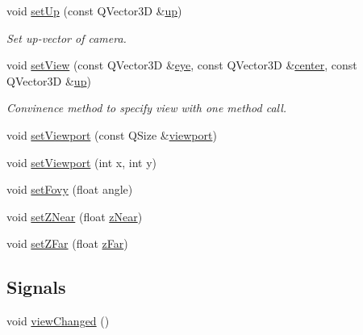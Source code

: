 \begin{DoxyCompactItemize}
void \hyperlink{class_camera_a037ef3f032c7fc09fa1f044260dd3a09}{set\+Up} (const Q\+Vector3\+D \&\hyperlink{class_camera_a86995a93a125a9d9941f10144c4c398e}{up})
\begin{DoxyCompactList}\small\item\em Set up-\/vector of camera. \end{DoxyCompactList}\item 
void \hyperlink{class_camera_a995075e3b619176b72ad2ff0ab434ed8}{set\+View} (const Q\+Vector3\+D \&\hyperlink{class_camera_aac5808300c4e00d266da238ad35b1a1b}{eye}, const Q\+Vector3\+D \&\hyperlink{class_camera_aacb30cc51aef5e3f98db5b51e3a4ef3b}{center}, const Q\+Vector3\+D \&\hyperlink{class_camera_a86995a93a125a9d9941f10144c4c398e}{up})
\begin{DoxyCompactList}\small\item\em Convinence method to specify view with one method call. \end{DoxyCompactList}\item 
void \hyperlink{class_camera_ad47041196bf35fed448003491112f528}{set\+Viewport} (const Q\+Size \&\hyperlink{class_camera_a56b601feb6a54eee0bce1910cdeac291}{viewport})
\item 
void \hyperlink{class_camera_ab0794a4ebc430368c5c3731e9bb35cdc}{set\+Viewport} (int x, int y)
\item 
void \hyperlink{class_camera_aa0e1d52fdb7e3d060041b960fa8b5c24}{set\+Fovy} (float angle)
\item 
void \hyperlink{class_camera_a4a8cda23fc022255f30452f608c66081}{set\+Z\+Near} (float \hyperlink{class_camera_a1db2166635ff27594eda3a23130b66ac}{z\+Near})
\item 
void \hyperlink{class_camera_a8ab94de2388acc72fa129fa203ccc587}{set\+Z\+Far} (float \hyperlink{class_camera_a6290469f972a5903c805725db563f41f}{z\+Far})
\end{DoxyCompactItemize}
\subsection*{Signals}
\begin{DoxyCompactItemize}
\item 
void \hyperlink{class_camera_af652ce7cb83eb966a90393be8e0038c3}{view\+Changed} ()
\end{DoxyCompactItemize}
